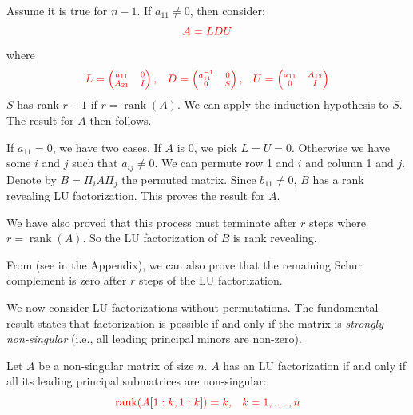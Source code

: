\documentclass[10pt,twoside]{siamart1116}
\DeclareMathOperator{\rk}{rank}
\numberwithin{theorem}{section}
\providecommand{\DIFdel}[1]{{\protect\color{red} \scriptsize #1}} %
\begin{document}
\DIFdel{Assume it is true for $n-1$. If $a_{11} \neq 0$, then consider:
	}\[
		\DIFdel{A = LDU
	}\]%
\DIFdel{where
	}\[
		\DIFdel{L = \begin{pmatrix}
			a_{11} & 0 \\
			A_{21} & I
		\end{pmatrix}, \quad
		D = \begin{pmatrix}
			a_{11}^{-1} & 0 \\
			0           & S
		\end{pmatrix}, \quad
		U = \begin{pmatrix}
			a_{11} & A_{12} \\
			0      & I
		\end{pmatrix}
	}\]%
\DIFdel{$S$ has rank $r-1$ if $r = \rk(A)$. We can apply the induction hypothesis to $S$. The result for $A$ then follows.
}%

\DIFdel{If $a_{11} = 0$, we have two cases. If $A$ is 0, we pick $L=U=0$. Otherwise we have some $i$ and $j$ such that $a_{ij} \neq 0$. We can permute row 1 and $i$ and column 1 and $j$. Denote by $B = \Pi_i A \Pi_j$ the permuted matrix. Since $b_{11} \neq 0$, $B$ has a rank revealing LU factorization. This proves the result for $A$.
}%

\DIFdel{We have also proved that this process must terminate after $r$ steps where $r = \rk(A)$. So the LU factorization of $B$ is rank revealing.
}%

\DIFdel{From }%
\DIFdel{(see }%
\DIFdel{in the Appendix), we can also prove that the remaining Schur complement is zero after $r$ steps of the LU factorization.
}%

\DIFdel{We now consider LU factorizations without permutations. The fundamental result states that factorization is possible if and only if the matrix is \emph{strongly non-singular} (i.e., all leading principal minors are non-zero).
}%

\DIFdel{Let $A$ be a non-singular matrix of size $n$. $A$ has an LU factorization if and only if all its leading principal submatrices are non-singular:
	}\[
		\DIFdel{\rk(A}[\DIFdel{1:k,1:k}]\DIFdel{) = k, \quad k = 1, \ldots, n
	}\]%
\end{document}
